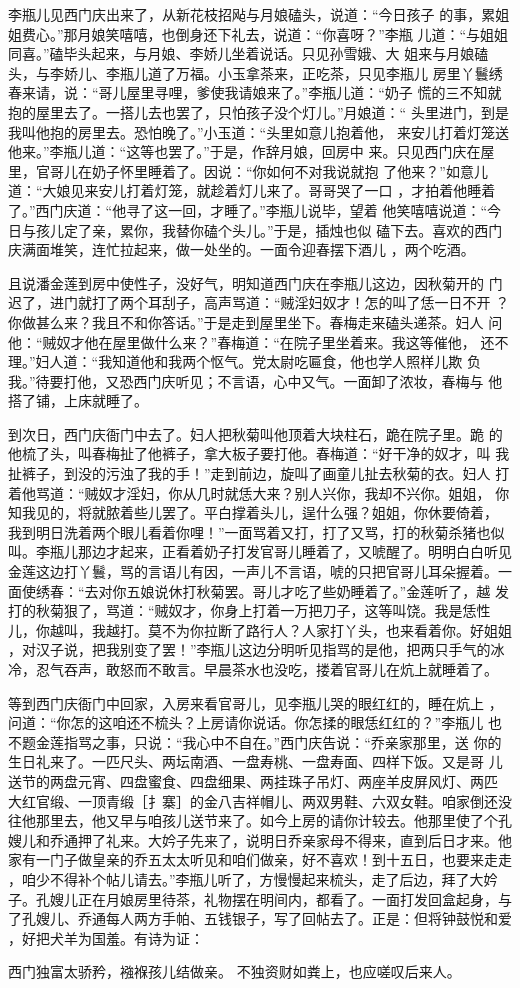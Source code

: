 李瓶儿见西门庆出来了，从新花枝招飐与月娘磕头，说道：“今日孩子
的事，累姐姐费心。”那月娘笑嘻嘻，也倒身还下礼去，说道：“你喜呀？”李瓶
儿道：“与姐姐同喜。”磕毕头起来，与月娘、李娇儿坐着说话。只见孙雪娥、大
姐来与月娘磕头，与李娇儿、李瓶儿道了万福。小玉拿茶来，正吃茶，只见李瓶儿
房里丫鬟绣春来请，说：“哥儿屋里寻哩，爹使我请娘来了。”李瓶儿道：“奶子
慌的三不知就抱的屋里去了。一搭儿去也罢了，只怕孩子没个灯儿。”月娘道：“
头里进门，到是我叫他抱的房里去。恐怕晚了。”小玉道：“头里如意儿抱着他，
来安儿打着灯笼送他来。”李瓶儿道：“这等也罢了。”于是，作辞月娘，回房中
来。只见西门庆在屋里，官哥儿在奶子怀里睡着了。因说：“你如何不对我说就抱
了他来？”如意儿道：“大娘见来安儿打着灯笼，就趁着灯儿来了。哥哥哭了一口
，才拍着他睡着了。”西门庆道：“他寻了这一回，才睡了。”李瓶儿说毕，望着
他笑嘻嘻说道：“今日与孩儿定了亲，累你，我替你磕个头儿。”于是，插烛也似
磕下去。喜欢的西门庆满面堆笑，连忙拉起来，做一处坐的。一面令迎春摆下酒儿
，两个吃酒。

且说潘金莲到房中使性子，没好气，明知道西门庆在李瓶儿这边，因秋菊开的
门迟了，进门就打了两个耳刮子，高声骂道：“贼淫妇奴才！怎的叫了恁一日不开
？你做甚么来？我且不和你答话。”于是走到屋里坐下。春梅走来磕头递茶。妇人
问他：“贼奴才他在屋里做什么来？”春梅道：“在院子里坐着来。我这等催他，
还不理。”妇人道：“我知道他和我两个怄气。党太尉吃匾食，他也学人照样儿欺
负我。”待要打他，又恐西门庆听见；不言语，心中又气。一面卸了浓妆，春梅与
他搭了铺，上床就睡了。

到次日，西门庆衙门中去了。妇人把秋菊叫他顶着大块柱石，跪在院子里。跪
的他梳了头，叫春梅扯了他裤子，拿大板子要打他。春梅道：“好干净的奴才，叫
我扯裤子，到没的污浊了我的手！”走到前边，旋叫了画童儿扯去秋菊的衣。妇人
打着他骂道：“贼奴才淫妇，你从几时就恁大来？别人兴你，我却不兴你。姐姐，
你知我见的，将就脓着些儿罢了。平白撑着头儿，逞什么强？姐姐，你休要倚着，
我到明日洗着两个眼儿看着你哩！”一面骂着又打，打了又骂，打的秋菊杀猪也似
叫。李瓶儿那边才起来，正看着奶子打发官哥儿睡着了，又唬醒了。明明白白听见
金莲这边打丫鬟，骂的言语儿有因，一声儿不言语，唬的只把官哥儿耳朵握着。一
面使绣春：“去对你五娘说休打秋菊罢。哥儿才吃了些奶睡着了。”金莲听了，越
发打的秋菊狠了，骂道：“贼奴才，你身上打着一万把刀子，这等叫饶。我是恁性
儿，你越叫，我越打。莫不为你拉断了路行人？人家打丫头，也来看着你。好姐姐
，对汉子说，把我别变了罢！”李瓶儿这边分明听见指骂的是他，把两只手气的冰
冷，忍气吞声，敢怒而不敢言。早晨茶水也没吃，搂着官哥儿在炕上就睡着了。

等到西门庆衙门中回家，入房来看官哥儿，见李瓶儿哭的眼红红的，睡在炕上
，问道：“你怎的这咱还不梳头？上房请你说话。你怎揉的眼恁红红的？”李瓶儿
也不题金莲指骂之事，只说：“我心中不自在。”西门庆告说：“乔亲家那里，送
你的生日礼来了。一匹尺头、两坛南酒、一盘寿桃、一盘寿面、四样下饭。又是哥
儿送节的两盘元宵、四盘蜜食、四盘细果、两挂珠子吊灯、两座羊皮屏风灯、两匹
大红官缎、一顶青缎［扌寨］的金八吉祥帽儿、两双男鞋、六双女鞋。咱家倒还没
往他那里去，他又早与咱孩儿送节来了。如今上房的请你计较去。他那里使了个孔
嫂儿和乔通押了礼来。大妗子先来了，说明日乔亲家母不得来，直到后日才来。他
家有一门子做皇亲的乔五太太听见和咱们做亲，好不喜欢！到十五日，也要来走走
，咱少不得补个帖儿请去。”李瓶儿听了，方慢慢起来梳头，走了后边，拜了大妗
子。孔嫂儿正在月娘房里待茶，礼物摆在明间内，都看了。一面打发回盒起身，与
了孔嫂儿、乔通每人两方手帕、五钱银子，写了回帖去了。正是：但将钟鼓悦和爱
，好把犬羊为国羞。有诗为证：

西门独富太骄矜，襁褓孩儿结做亲。
不独资财如粪上，也应嗟叹后来人。